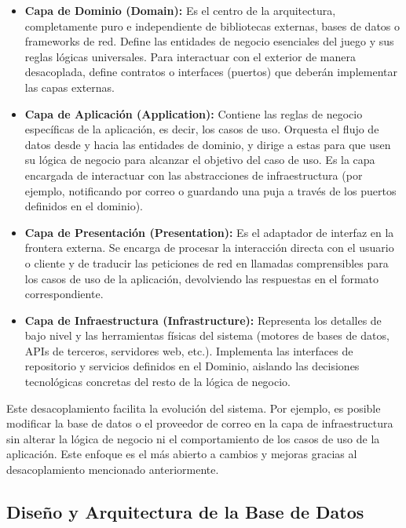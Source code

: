 \begin{itemize}
    \item \textbf{Capa de Dominio (Domain):} Es el centro de la arquitectura, completamente puro e independiente de bibliotecas externas, bases de datos o frameworks de red. Define las entidades de negocio esenciales del juego y sus reglas lógicas universales. Para interactuar con el exterior de manera desacoplada, define contratos o interfaces (puertos) que deberán implementar las capas externas.
    
    \item \textbf{Capa de Aplicación (Application):} Contiene las reglas de negocio específicas de la aplicación, es decir, los casos de uso. Orquesta el flujo de datos desde y hacia las entidades de dominio, y dirige a estas para que usen su lógica de negocio para alcanzar el objetivo del caso de uso. Es la capa encargada de interactuar con las abstracciones de infraestructura (por ejemplo, notificando por correo o guardando una puja a través de los puertos definidos en el dominio).
    
    \item \textbf{Capa de Presentación (Presentation):} Es el adaptador de interfaz en la frontera externa. Se encarga de procesar la interacción directa con el usuario o cliente y de traducir las peticiones de red en llamadas comprensibles para los casos de uso de la aplicación, devolviendo las respuestas en el formato correspondiente.
    
    \item \textbf{Capa de Infraestructura (Infrastructure):} Representa los detalles de bajo nivel y las herramientas físicas del sistema (motores de bases de datos, APIs de terceros, servidores web, etc.). Implementa las interfaces de repositorio y servicios definidos en el Dominio, aislando las decisiones tecnológicas concretas del resto de la lógica de negocio.
\end{itemize}

Este desacoplamiento facilita la evolución del sistema. Por ejemplo, es posible modificar la base de datos o el proveedor de correo en la capa de infraestructura sin alterar la lógica de negocio ni el comportamiento de los casos de uso de la aplicación. Este enfoque es el más abierto a cambios y mejoras gracias al desacoplamiento mencionado anteriormente.


\subsection{Diseño y Arquitectura de la Base de Datos}
\label{subsec:diseno_bd}

